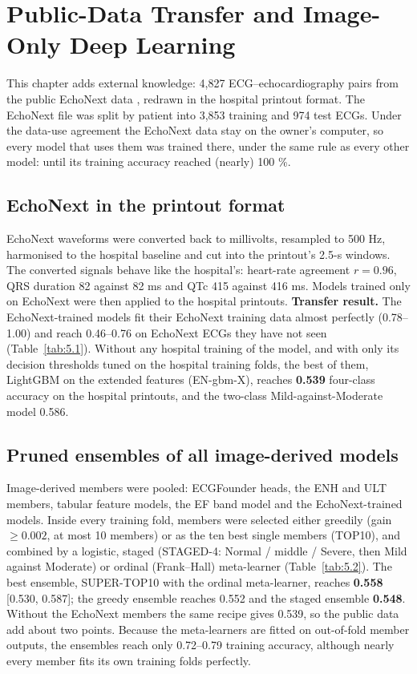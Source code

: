 \chapter{Public-Data Transfer and Image-Only Deep Learning}\label{ch:5}

This chapter adds external knowledge: 4,827 ECG--echocardiography pairs from the public EchoNext data \cite{ref23}, redrawn in the hospital printout format. The EchoNext file was split by patient into 3,853 training and 974 test ECGs. Under the data-use agreement the EchoNext data stay on the owner's computer, so every model that uses them was trained there, under the same rule as every other model: until its training accuracy reached (nearly) 100 \%.

\section{EchoNext in the printout format}\label{sec:5.1}



EchoNext waveforms were converted back to millivolts, resampled to 500 Hz, harmonised to the hospital baseline and cut into the printout's 2.5-s windows. The converted signals behave like the hospital's: heart-rate agreement $r=0.96$, QRS duration 82 against 82 ms and QTc 415 against 416 ms. Models trained only on EchoNext were then applied to the hospital printouts. \textbf{Transfer result.} The EchoNext-trained models fit their EchoNext training data almost perfectly (0.78--1.00) and reach 0.46--0.76 on EchoNext ECGs they have not seen (Table~\ref{tab:5.1}). Without any hospital training of the model, and with only its decision thresholds tuned on the hospital training folds, the best of them, LightGBM on the extended features (EN-gbm-X), reaches \textbf{0.539} four-class accuracy on the hospital printouts, and the two-class Mild-against-Moderate model 0.586.

\section{Pruned ensembles of all image-derived models}\label{sec:5.2}



Image-derived members were pooled: ECGFounder heads, the ENH and ULT members, tabular feature models, the EF band model and the EchoNext-trained models. Inside every training fold, members were selected either greedily (gain $\ge0.002$, at most 10 members) or as the ten best single members (TOP10), and combined by a logistic, staged (STAGED-4: Normal / middle / Severe, then Mild against Moderate) or ordinal (Frank--Hall) meta-learner (Table~\ref{tab:5.2}). The best ensemble, SUPER-TOP10 with the ordinal meta-learner, reaches \textbf{0.558} [0.530, 0.587]; the greedy ensemble reaches 0.552 and the staged ensemble \textbf{0.548}. Without the EchoNext members the same recipe gives 0.539, so the public data add about two points. Because the meta-learners are fitted on out-of-fold member outputs, the ensembles reach only 0.72--0.79 training accuracy, although nearly every member fits its own training folds perfectly.

